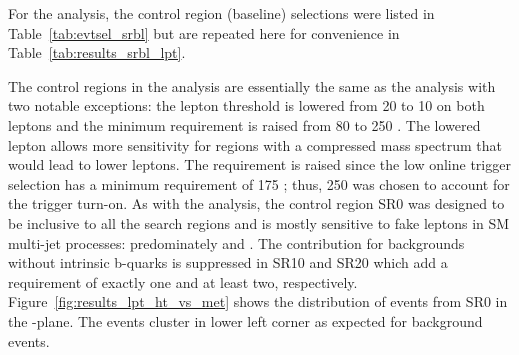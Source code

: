 For the \lpt analysis, the control region (baseline) selections were
listed in Table~\ref{tab:evtsel_srbl} but are repeated here for convenience in
Table~\ref{tab:results_srbl_lpt}.
\begin{table}[!tbh]
\begin{center}
\caption[Summary of the baseline search regions considered in the \lpt analysis]
{\label{tab:results_srbl_lpt}
Summary of the baseline search regions considered in the \lpt analysis.
}
\end{center}
\end{table}  
The control regions in the \lpt analysis are essentially the same as the \hpt
analysis with two notable exceptions: the lepton \pt threshold is lowered from
20 to 10 \GeV on both leptons and the minimum \Ht requirement is raised from
80 to 250 \GeV. The lowered lepton \pt allows more sensitivity for regions
with a compressed mass spectrum that would lead to lower \pt leptons. The
\Ht requirement is raised since the low \pt online trigger selection has a
minimum \Ht requirement of 175 \GeV; thus, 250 \GeV was chosen to account for
the trigger turn-on. As with the \hpt analysis, the control region SR0 was
designed to be inclusive to all the search regions and is mostly sensitive
to fake leptons in SM multi-jet processes: predominately \ttbar and \Wj. The
contribution for backgrounds without intrinsic b-quarks is suppressed in SR10
and SR20 which add a \nbtags requirement of exactly one and at least two,
respectively. Figure~\ref{fig:results_lpt_ht_vs_met} shows the distribution of
events from SR0 in the \Ht-\met plane. The events cluster in lower left corner
as expected for background events.

